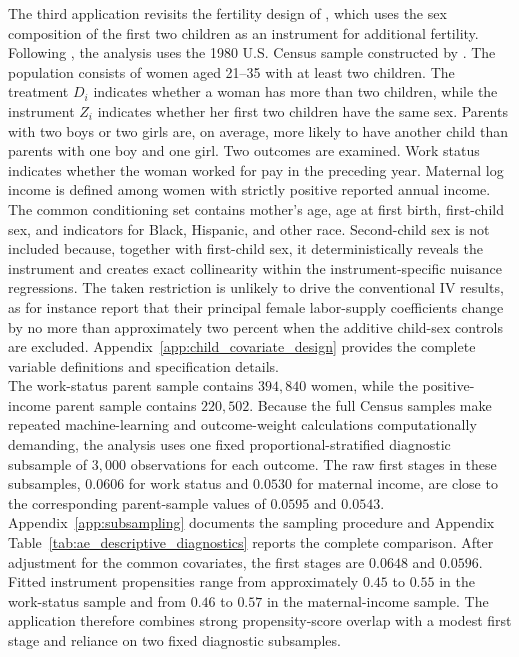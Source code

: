 \documentclass[12pt, a4paper, oneside]{article}
\theoremstyle{plain}
\theoremstyle{definition}
\begin{document}
The third application revisits the fertility design of \citet{angrist1996children}, which uses the sex composition of the first two children as an instrument for additional fertility. Following \citet{sloczynski2025abadie}, the analysis uses the 1980 U.S. Census sample constructed by \citet{farbmacher2018increasing}. The population consists of women aged 21–35 with at least two children. The treatment \(D_i\) indicates whether a woman has more than two children, while the instrument \(Z_i\) indicates whether her first two children have the same sex. Parents with two boys or two girls are, on average, more likely to have another child than parents with one boy and one girl.
Two outcomes are examined. Work status indicates whether the woman worked for pay in the preceding year. Maternal log income is defined among women with strictly positive reported annual income. The common conditioning set contains mother’s age, age at first birth, first-child sex, and indicators for Black, Hispanic, and other race.
 Second-child sex is not included because,
together with first-child sex, it deterministically reveals the instrument and
creates exact collinearity within the instrument-specific nuisance regressions.
The taken restriction is unlikely to drive the conventional IV results, as 
\citet{angrist1996children} for instance report that their principal female labor-supply
coefficients change by no more than approximately two percent when the additive
child-sex controls are excluded. Appendix~\ref{app:child_covariate_design} provides the complete variable definitions and specification details.\\
The work-status parent sample contains \(394{,}840\) women, while the positive-income parent sample contains \(220{,}502\). Because the full Census samples make repeated machine-learning and outcome-weight calculations computationally demanding, the analysis uses one fixed proportional-stratified diagnostic subsample of \(3{,}000\) observations for each outcome.
The raw first stages in these subsamples, \(0.0606\) for work status and \(0.0530\) for maternal income, are close to the corresponding parent-sample values of \(0.0595\) and \(0.0543\).
Appendix~\ref{app:subsampling} documents the sampling procedure and Appendix Table~\ref{tab:ae_descriptive_diagnostics} reports the complete comparison.
After adjustment for the common covariates, the first stages are \(0.0648\) and \(0.0596\). Fitted instrument propensities range from approximately \(0.45\) to \(0.55\) in the work-status sample and from \(0.46\) to \(0.57\) in the maternal-income sample. The application therefore combines strong propensity-score overlap with a modest first stage and reliance on two fixed diagnostic subsamples.
\end{document}
